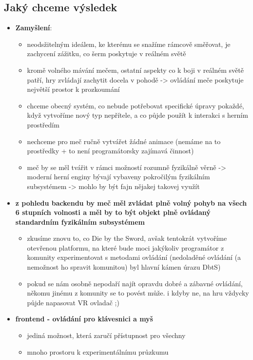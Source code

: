 \subsection{Jaký chceme výsledek}
\begin{itemize}
    \item \textbf{Zamyšlení}:
        \begin{itemize}
            \item neodsžitelným ideálem, ke kterému se snažíme rámcově směřovat, je zachycení zážitku, co šerm poskytuje v reálném světě
            \item kromě volného mávání mečem, ostatní aspekty co k boji v reálném světě patří, hry zvládají zachytit docela v pohodě -> ovládání meče poskytuje největší prostor k prozkoumání
            \item chceme obecný systém, co nebude potřebovat specifické úpravy pokaždé, když vytvoříme nový typ nepřítele, a co půjde použít k interakci s herním prostředím
            \item nechceme pro meč ručně vytvářet žádné animace (nemáme na to prostředky + to není programátorsky zajímavá činnost)
            \item meč by se měl tvářit v rámci možností rozumně fyzikálně věrně -> moderní herní enginy bývají vybaveny pokročilým fyzikálním subsystémem -> mohlo by být fajn nějakej takovej využít
        \end{itemize}
    
    \item \textbf{z pohledu backendu by meč měl zvládat plně volný pohyb na všech 6 stupních volnosti a měl by to být objekt plně ovládaný standardním fyzikálním subsystémem}
        \begin{itemize}
            \item zkusíme znovu to, co Die by the Sword, avšak tentokrát vytvoříme otevřenou platformu, na které bude moci jakýkoliv programátor z komunity experimentovat s metodami ovládání (nedoladěné ovládání (a nemožnost ho spravit komunitou) byl hlavní kámen úrazu DbtS)
            \item pokud se nám osobně nepodaří najít opravdu dobré a zábavné ovládání, někomu jinému z komunity se to povést může. i kdyby ne, na hru vždycky půjde napasovat VR ovladač ;)
        \end{itemize}
    \item \textbf{frontend - ovládání pro klávesnici a myš}
        \begin{itemize}
            \item jediná možnost, která zaručí přístupnost pro všechny
            \item mnoho prostoru k experimentálnímu průzkumu
        \end{itemize}
\end{itemize}

